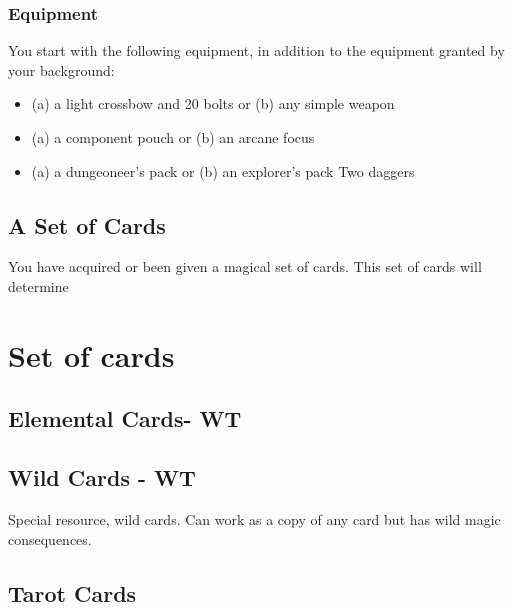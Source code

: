 \subsubsection{Equipment}
You start with the following equipment, in addition to
the equipment granted by your background:
\begin{itemize}
	\item (a) a light crossbow and 20 bolts or (b) any simple weapon
	\item (a) a component pouch or (b) an arcane focus
	\item (a) a dungeoneer's pack or (b) an explorer's pack Two daggers
\end{itemize}

\subsection{A Set of Cards}
You have acquired or been given a magical set of cards. This set of cards will determine 

\section{Set of cards}

\subsection{Elemental Cards- WT}

\subsection{Wild Cards - WT}
Special resource, wild cards. Can work as a copy of any card but has wild magic consequences.

\subsection{Tarot Cards}
